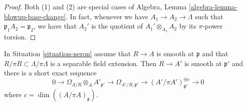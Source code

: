 \begin{proof}
Both (1) and (2) are special cases of
Algebra, Lemma \ref{algebra-lemma-blowup-base-change}.
In fact, whenever we have $A_1 \to A_2 \to \Lambda$ such that
$\mathfrak p_1 A_2 = \mathfrak p_2$, we have that $A_2'$ is
the quotient of $A_1' \otimes_{A_1} A_2$ by its $\pi$-power torsion.
\end{proof}

\begin{lemma}
\label{lemma-neron-blowup-smooth}
In Situation \ref{situation-neron} assume that $R \to A$ is smooth
at $\mathfrak p$ and that $R/\pi R \subset \Lambda/\pi \Lambda$
is a separable field extension. Then $R \to A'$ is smooth at
$\mathfrak p'$ and there is a short exact sequence
$$
0 \to
\Omega_{A/R} \otimes_A A'_{\mathfrak p'} \to
\Omega_{A'/R, \mathfrak p'} \to
(A'/\pi A')_{\mathfrak p'}^{\oplus c} \to 0
$$
where $c = \dim((A/\pi A)_\mathfrak p)$.
\end{lemma}

